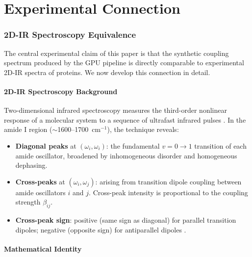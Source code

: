 \documentclass[11pt,twocolumn,a4paper]{article}
\theoremstyle{definition}
\theoremstyle{remark}
\newcommand{\natfreq}{\omega}
\begin{document}
\part{Experimental Connection}

\section{2D-IR Spectroscopy Equivalence}
\label{sec:2dir}

The central experimental claim of this paper is that the synthetic coupling spectrum produced by the GPU pipeline is directly comparable to experimental 2D-IR spectra of proteins. We now develop this connection in detail.

\subsection{2D-IR Spectroscopy Background}

Two-dimensional infrared spectroscopy measures the third-order nonlinear response of a molecular system to a sequence of ultrafast infrared pulses \citep{hamm2011}. In the amide I region ($\sim$1600--1700~cm$^{-1}$), the technique reveals:

\begin{itemize}
    \item \textbf{Diagonal peaks} at $(\natfreq_i, \natfreq_i)$: the fundamental $v=0 \to 1$ transition of each amide oscillator, broadened by inhomogeneous disorder and homogeneous dephasing.
    \item \textbf{Cross-peaks} at $(\natfreq_i, \natfreq_j)$: arising from transition dipole coupling between amide oscillators $i$ and $j$. Cross-peak intensity is proportional to the coupling strength $\beta_{ij}$.
    \item \textbf{Cross-peak sign}: positive (same sign as diagonal) for parallel transition dipoles; negative (opposite sign) for antiparallel dipoles \citep{kim2009}.
\end{itemize}

\subsection{Mathematical Identity}
\end{document}
